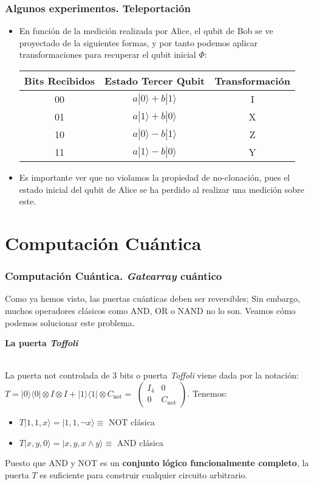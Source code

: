\documentclass{beamer}
\newcommand{\base}[1]{|#1\rangle}
\newcommand{\lbase}[1]{\langle#1|}
\newcommand{\cnot}{C_{\mathrm{not}}}
\begin{document}
\begin{frame}
	\frametitle{Algunos experimentos. Teleportación}
	\begin{itemize}
	\item En función de la medición realizada por Alice, el qubit de Bob se ve proyectado de la siguientes formas, y por tanto podemos aplicar transformaciones para recuperar el qubit inicial  $\Phi$:
	\begin{center}
 		\begin{tabular}{||c c c||} 
 		\hline
 		Bits Recibidos & Estado Tercer Qubit & Transformación \\ [0.8ex] 
	 	\hline\hline
 		00 & $a\base0 + b\base1$ & I \\ 
 		\hline
	 	01 & $a\base1 + b\base0$ & X \\
 		\hline
	 	10 & $a\base0 - b\base1$ & Z \\
	 	\hline
	 	11 & $a\base1 - b\base0$ & Y \\[1ex]
	 	\hline
		\end{tabular}
	\end{center}
	\item Es importante ver que no violamos la propiedad de no-clonación, pues el estado inicial del qubit de Alice se ha perdido al realizar una medición sobre este.
	\end{itemize}
\end{frame}

\section{Computación Cuántica}

\begin{frame}
	\frametitle{Computación Cuántica. \textit{Gatearray} cuántico}
	Como ya hemos visto, las puertas cuánticas deben ser reversibles; Sin embargo, muchos operadores clásicos como AND, OR o NAND no lo son. Veamos cómo podemos solucionar este problema.\newline
	
	\begin{Large}\textbf{La puerta \textit{Toffoli}}\end{Large}
	\newline\\
	La puerta not controlada de 3 bits o puerta \textit{Toffoli} viene dada por la notación:
	$T=\base0\lbase0\otimes I\otimes I +\base1\lbase1\otimes \cnot=$
	$\left({\begin{array}{c|c}	I_4&0\\\hline0&\cnot \end{array} } \right)$. Tenemos:
	
	\begin{itemize}
	\item $T\base{1,1,x}=\base{1,1,\neg x}\equiv$ NOT clásica
	\item $T\base{x,y,0}=\base{x,y,x\land y}\equiv$ AND clásica
	\end{itemize}
	Puesto que AND y NOT es un \textbf{conjunto lógico funcionalmente completo}, la puerta $T$ es suficiente para construir cualquier circuito arbitrario.
\end{frame}
\end{document}
